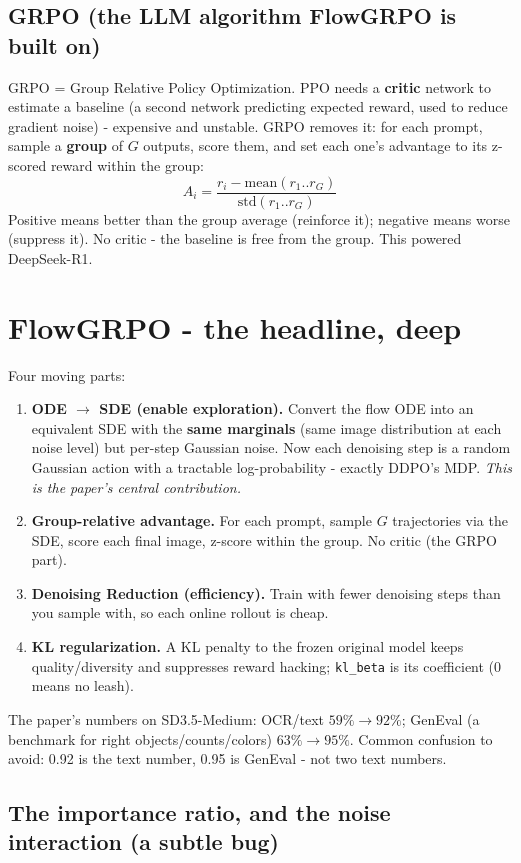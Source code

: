 \documentclass[11pt]{article}
\newcommand{\code}[1]{\texttt{\small #1}}
\begin{document}
\subsection{GRPO (the LLM algorithm FlowGRPO is built on)}
GRPO = Group Relative Policy Optimization. PPO needs a \textbf{critic} network to
estimate a baseline (a second network predicting expected reward, used to reduce
gradient noise) - expensive and unstable. GRPO removes it: for each prompt, sample a
\textbf{group} of $G$ outputs, score them, and set each one's advantage to its
z-scored reward within the group:
\[
A_i = \frac{r_i - \text{mean}(r_1..r_G)}{\text{std}(r_1..r_G)}
\]
Positive means better than the group average (reinforce it); negative means worse
(suppress it). No critic - the baseline is free from the group. This powered
DeepSeek-R1.

\section{FlowGRPO - the headline, deep}

Four moving parts:
\begin{enumerate}
\item \textbf{ODE $\to$ SDE (enable exploration).} Convert the flow ODE into an
equivalent SDE with the \textbf{same marginals} (same image distribution at each noise
level) but per-step Gaussian noise. Now each denoising step is a random Gaussian action
with a tractable log-probability - exactly DDPO's MDP. \textit{This is the paper's
central contribution.}
\item \textbf{Group-relative advantage.} For each prompt, sample $G$ trajectories via
the SDE, score each final image, z-score within the group. No critic (the GRPO part).
\item \textbf{Denoising Reduction (efficiency).} Train with fewer denoising steps than
you sample with, so each online rollout is cheap.
\item \textbf{KL regularization.} A KL penalty to the frozen original model keeps
quality/diversity and suppresses reward hacking; \code{kl\_beta} is its coefficient
(0 means no leash).
\end{enumerate}
The paper's numbers on SD3.5-Medium: OCR/text $59\% \to 92\%$; GenEval (a benchmark
for right objects/counts/colors) $63\% \to 95\%$. Common confusion to avoid: 0.92 is
the text number, 0.95 is GenEval - not two text numbers.

\subsection{The importance ratio, and the noise interaction (a subtle bug)}
\end{document}
